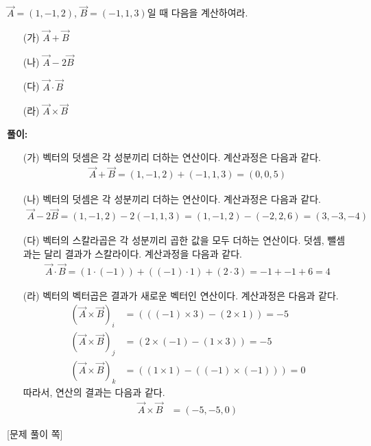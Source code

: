 \documentclass[floatfix,nofootinbib,superscriptaddress,fleqn,preprint]{revtex4-2}
\begin{document}
 $\vec{A}=(1,-1,2)$, $\vec{B}=(-1,1,3)$일 때
다음을 계산하여라.
\begin{itemize}
\item[(가)] $\vec{A}+\vec{B}$
\item[(나)] $\vec{A}-2\vec{B}$
\item[(다)] $\vec{A}\cdot\vec{B}$
\item[(라)] $\vec{A}\times\vec{B}$
\end{itemize}
\noindent \textbf{풀이:}
\begin{itemize}
  \item[(가)]  벡터의 덧셈은 각 성분끼리 더하는 연산이다. 계산과정은 다음과 같다.
  \begin{align*}
    \vec{A}+\vec{B} = (1,-1,2)+(-1,1,3)=(0,0,5)  
  \end{align*}
  
  \item[(나)] 벡터의 덧셈은 각 성분끼리 더하는 연산이다. 계산과정은 다음과 같다.
  \begin{align*}
    \vec{A}-2\vec{B} = (1,-1,2)-2(-1,1,3)=(1,-1,2)-(-2,2,6)=(3,-3,-4)  
  \end{align*}
  \item[(다)] 벡터의 스칼라곱은 각 성분끼리 곱한 값을 모두 더하는 연산이다. 덧셈, 뺄셈과는 달리 결과가 스칼라이다. 계산과정을 다음과 같다.
  \begin{align*}
    \vec{A}\cdot\vec{B} = (1\cdot(-1))+((-1)\cdot 1)+(2\cdot 3)=-1+-1+6=4  
  \end{align*}
  \item[(라)] 벡터의 벡터곱은 결과가 새로운 벡터인 연산이다. 계산과정은 다음과 같다.
  \begin{align*}
    {(\vec{A}\times\vec{B})}_i &= (((-1)\times 3) - (2 \times 1)) = -5 \\
    {(\vec{A}\times\vec{B})}_j &= (2 \times (-1) -(1 \times 3)) = -5\\
    {(\vec{A}\times\vec{B})}_k &= ((1 \times 1)-((-1)\times (-1))) = 0
  \end{align*}
  따라서, 연산의 결과는 다음과 같다.
  \begin{align*}
    \vec{A}\times\vec{B}  &= (-5,-5,0)
  \end{align*}
  
\end{itemize}
\newpage

{\color{gray} [문제 풀이 쪽]}

\newpage 
\end{document}
